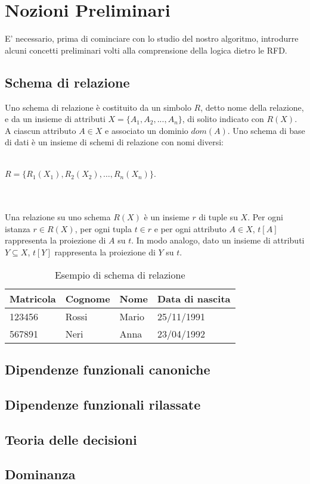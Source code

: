 \section{Nozioni Preliminari}
E' necessario, prima di cominciare con lo studio del nostro algoritmo, introdurre alcuni concetti preliminari volti alla comprensione della logica dietro le RFD.

\subsection{Schema di relazione}
Uno schema di relazione è costituito da un simbolo $R$, detto nome della relazione, e da un insieme di attributi $X = \{A_1,A_2,...,A_n\}$, di solito indicato
con $R(X)$. A ciascun attributo $A \in X$ e associato un dominio $dom(A)$.
Uno schema di base di dati è un insieme di schemi di relazione con nomi
diversi:
\\ \\
\centerline{$R = \{ R_1(X_1),R_2(X_2),\ldots,R_n(X_n)\}$.}
\\ \\
Una relazione su uno schema $R(X)$ è un insieme $r$ di tuple su $X$. Per
ogni istanza $r \in R(X)$, per ogni tupla $t \in r$ e per ogni attributo $A \in X$,
$t[A]$ rappresenta la proiezione di $A$ su $t$. In modo analogo, dato un insieme
di attributi $Y \subseteq X$, $t[Y]$ rappresenta la proiezione di $Y$ su $t$.\cite{libroCeri}
\\

\begin{table}[H]
    \centering
    \begin{tabular}{ | l | l | l | l |}
        \hline
        Matricola & Cognome & Nome & Data di nascita\\
        \hline
        123456 & Rossi & Mario & 25/11/1991 \\ 
        567891 & Neri & Anna & 23/04/1992 \\ 
        \hline
    \end{tabular}
    \caption{Esempio di schema di relazione}
    \label{tab:table example}
\end{table}

\subsection{Dipendenze funzionali canoniche}
\subsection{Dipendenze funzionali rilassate}
\subsection{Teoria delle decisioni}
\subsection{Dominanza}